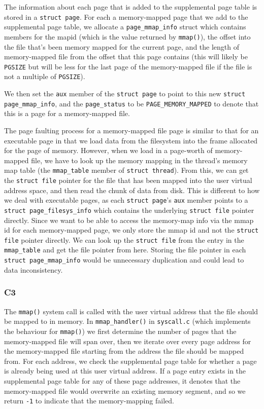 \documentclass[a4wide, 11pt]{article}
\newcommand{\tx}{\texttt}
\begin{document}
The information about each page that is added to the supplemental page table is stored in a \tx{struct page}. For each a memory-mapped page that we add to the supplemental page table, we allocate a \tx{page\_mmap\_info} struct which contains members for the mapid (which is the value returned by \tx{mmap()}), the offset into the file that's been memory mapped for the current page, and the length of memory-mapped file from the offset that this page contains (this will likely be \tx{PGSIZE} but will be less for the last page of the memory-mapped file if the file is not a multiple of \tx{PGSIZE}).

We then set the \tx{aux} member of the \tx{struct page} to point to this new \tx{struct page\_mmap\_info}, and the \tx{page\_status} to be \tx{PAGE\_MEMORY\_MAPPED} to denote that this is a page for a memory-mapped file.

The page faulting process for a memory-mapped file page is similar to that for an executable page in that we load data from the filesystem into the frame allocated for the page of memory. However, when we load in a page-worth of memory-mapped file, we have to look up the memory mapping in the thread's memory map table (the \tx{mmap\_table} member of \tx{struct thread}). From this, we can get the \tx{struct file} pointer for the file that has been mapped into the user virtual address space, and then read the chunk of data from disk. This is different to how we deal with executable pages, as each \tx{struct page}'s \tx{aux} member points to a \tx{struct page\_filesys\_info} which contains the underlying \tx{struct file} pointer directly. Since we want to be able to access the memory-map info via the mmap id for each memory-mapped page, we only store the mmap id and not the \tx{struct file} pointer directly. We can look up the \tx{struct file} from the entry in the \tx{mmap\_table} and get the file pointer from here. Storing the file pointer in each \tx{struct page\_mmap\_info} would be unnecessary duplication and could lead to data inconsistency.

\subsubsection{C3}

The \tx{mmap()} system call is called with the user virtual address that the file should be mapped to in memory. In \tx{mmap\_handler()} in \tx{syscall.c} (which implements the behaviour for \tx{mmap()}) we first determine the number of pages that the memory-mapped file will span over, then we iterate over every page address for the memory-mapped file starting from the address the file should be mapped from. For each address, we check the supplemental page table for whether a page is already being used at this user virtual address. If a page entry exists in the supplemental page table for any of these page addresses, it denotes that the memory-mapped file would overwrite an existing memory segment, and so we return \tx{-1} to indicate that the memory-mapping failed.
\end{document}
